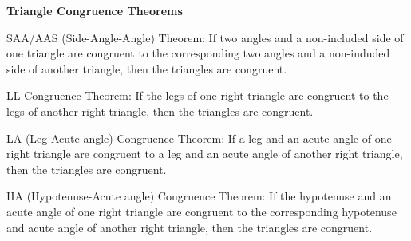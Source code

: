 \begin{center}
\textbf{Triangle Congruence Theorems}
\end{center}

\vspace*{1ex}

SAA/AAS (Side-Angle-Angle) Theorem: 
If two angles and a non-included side of one triangle are congruent to the corresponding two angles and a non-induded side of another triangle, then the triangles are congruent.

\vspce 

LL  Congruence Theorem:  If  the  legs  of  one  right  triangle  are  congruent  to  the  legs  of  another  right  triangle,  then the triangles are congruent.

\vspce 

LA (Leg-Acute angle) Congruence Theorem:  If  a  leg  and  an  acute  angle  of  one  right  triangle  are  congruent  to  a  leg  and  an  acute angle of another right triangle, then the triangles are congruent.

\vspce 

HA (Hypotenuse-Acute angle) Congruence Theorem:  If  the hypotenuse  and  an  acute  angle  of  one  right  triangle are  congruent  to  the corresponding hypotenuse  and   acute angle of another right triangle, then the triangles are congruent.








